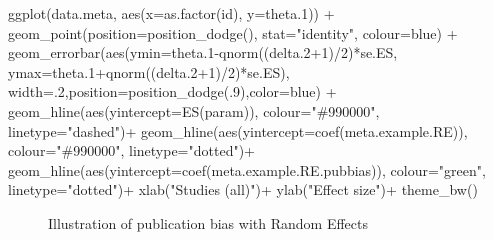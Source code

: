 \documentclass[
]{book}
\newenvironment{Shaded}{\begin{snugshade}}{\end{snugshade}}
\newcommand{\AttributeTok}[1]{\textcolor[rgb]{0.77,0.63,0.00}{#1}}
\newcommand{\DecValTok}[1]{\textcolor[rgb]{0.00,0.00,0.81}{#1}}
\newcommand{\FloatTok}[1]{\textcolor[rgb]{0.00,0.00,0.81}{#1}}
\newcommand{\FunctionTok}[1]{\textcolor[rgb]{0.00,0.00,0.00}{#1}}
\newcommand{\NormalTok}[1]{#1}
\newcommand{\SpecialCharTok}[1]{\textcolor[rgb]{0.00,0.00,0.00}{#1}}
\newcommand{\StringTok}[1]{\textcolor[rgb]{0.31,0.60,0.02}{#1}}
\theoremstyle{definition}
\theoremstyle{definition}
\theoremstyle{definition}
\theoremstyle{definition}
\theoremstyle{remark}
\begin{document}
\begin{Shaded}
\begin{Highlighting}[]
  \FunctionTok{ggplot}\NormalTok{(data.meta, }\FunctionTok{aes}\NormalTok{(}\AttributeTok{x=}\FunctionTok{as.factor}\NormalTok{(id), }\AttributeTok{y=}\NormalTok{theta}\FloatTok{.1}\NormalTok{)) }\SpecialCharTok{+}
      \FunctionTok{geom\_point}\NormalTok{(}\AttributeTok{position=}\FunctionTok{position\_dodge}\NormalTok{(), }\AttributeTok{stat=}\StringTok{"identity"}\NormalTok{, }\AttributeTok{colour=}\StringTok{\textquotesingle{}blue\textquotesingle{}}\NormalTok{) }\SpecialCharTok{+}
      \FunctionTok{geom\_errorbar}\NormalTok{(}\FunctionTok{aes}\NormalTok{(}\AttributeTok{ymin=}\NormalTok{theta}\FloatTok{.1}\SpecialCharTok{{-}}\FunctionTok{qnorm}\NormalTok{((delta}\FloatTok{.2}\SpecialCharTok{+}\DecValTok{1}\NormalTok{)}\SpecialCharTok{/}\DecValTok{2}\NormalTok{)}\SpecialCharTok{*}\NormalTok{se.ES, }\AttributeTok{ymax=}\NormalTok{theta}\FloatTok{.1}\SpecialCharTok{+}\FunctionTok{qnorm}\NormalTok{((delta}\FloatTok{.2}\SpecialCharTok{+}\DecValTok{1}\NormalTok{)}\SpecialCharTok{/}\DecValTok{2}\NormalTok{)}\SpecialCharTok{*}\NormalTok{se.ES), }\AttributeTok{width=}\NormalTok{.}\DecValTok{2}\NormalTok{,}\AttributeTok{position=}\FunctionTok{position\_dodge}\NormalTok{(.}\DecValTok{9}\NormalTok{),}\AttributeTok{color=}\StringTok{\textquotesingle{}blue\textquotesingle{}}\NormalTok{) }\SpecialCharTok{+}
      \FunctionTok{geom\_hline}\NormalTok{(}\FunctionTok{aes}\NormalTok{(}\AttributeTok{yintercept=}\FunctionTok{ES}\NormalTok{(param)), }\AttributeTok{colour=}\StringTok{"\#990000"}\NormalTok{, }\AttributeTok{linetype=}\StringTok{"dashed"}\NormalTok{)}\SpecialCharTok{+}
      \FunctionTok{geom\_hline}\NormalTok{(}\FunctionTok{aes}\NormalTok{(}\AttributeTok{yintercept=}\FunctionTok{coef}\NormalTok{(meta.example.RE)), }\AttributeTok{colour=}\StringTok{"\#990000"}\NormalTok{, }\AttributeTok{linetype=}\StringTok{"dotted"}\NormalTok{)}\SpecialCharTok{+}
      \FunctionTok{geom\_hline}\NormalTok{(}\FunctionTok{aes}\NormalTok{(}\AttributeTok{yintercept=}\FunctionTok{coef}\NormalTok{(meta.example.RE.pubbias)), }\AttributeTok{colour=}\StringTok{"green"}\NormalTok{, }\AttributeTok{linetype=}\StringTok{"dotted"}\NormalTok{)}\SpecialCharTok{+}
      \FunctionTok{xlab}\NormalTok{(}\StringTok{"Studies (all)"}\NormalTok{)}\SpecialCharTok{+}
      \FunctionTok{ylab}\NormalTok{(}\StringTok{"Effect size"}\NormalTok{)}\SpecialCharTok{+}
      \FunctionTok{theme\_bw}\NormalTok{()}
\end{Highlighting}
\end{Shaded}

\begin{figure}[htbp]

{\centering {}

}

\caption{Illustration of publication bias with Random Effects}\label{fig:PubBiasRE}
\end{figure}
\end{document}
